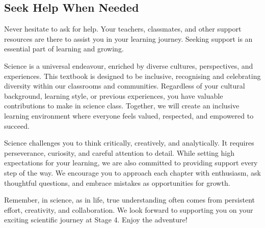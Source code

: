 \subsection{Seek Help When Needed}

Never hesitate to ask for help. Your teachers, classmates, and other support resources are there to assist you in your learning journey. Seeking support is an essential part of learning and growing.

\FloatBarrier

\FloatBarrier

Science is a universal endeavour, enriched by diverse cultures, perspectives, and experiences. This textbook is designed to be inclusive, recognising and celebrating diversity within our classrooms and communities. Regardless of your cultural background, learning style, or previous experiences, you have valuable contributions to make in science class. Together, we will create an inclusive learning environment where everyone feels valued, respected, and empowered to succeed.

\FloatBarrier

Science challenges you to think critically, creatively, and analytically. It requires perseverance, curiosity, and careful attention to detail. While setting high expectations for your learning, we are also committed to providing support every step of the way. We encourage you to approach each chapter with enthusiasm, ask thoughtful questions, and embrace mistakes as opportunities for growth. 

Remember, in science, as in life, true understanding often comes from persistent effort, creativity, and collaboration. We look forward to supporting you on your exciting scientific journey at Stage 4. Enjoy the adventure!

\FloatBarrier
